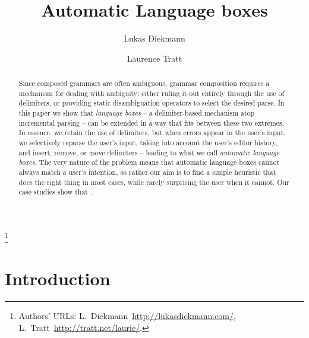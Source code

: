 \documentclass[sigplan,screen]{acmart}\settopmatter{printfolios=true,printccs=false,printacmref=false}
\begin{document}
\title{Automatic Language boxes}

\author{Lukas Diekmann}
\author{Laurence Tratt}
\thanks{Authors' URLs: %
    L.~Diekmann~\url{http://lukasdiekmann.com/},
    L.~Tratt~\url{http://tratt.net/laurie/}.
}


\begin{abstract}
Since composed grammars are often ambiguous, grammar composition requires a
mechanism for dealing with ambiguity: either ruling it out entirely through the use of
delimiters, or providing static disambiguation operators to select the desired
parse. In this paper we show that \emph{language boxes} -- a delimiter-based
mechanism atop incremental parsing -- can be extended in a way that fits
between these two extremes. In essence, we retain the use of delimiters, but
when errors appear in the user's input, we selectively reparse the user's
input, taking into account the user's editor history, and insert, remove,
or move delimiters -- leading to what we call \emph{automatic language
boxes}. The very nature of the problem means that automatic language boxes
cannot always match a user's intention, so rather our aim is to find a simple
heuristic that does the right thing in most cases, while rarely surprising the
user when it cannot. Our case studies show that .
\end{abstract}


\maketitle

\section{Introduction}
\end{document}
